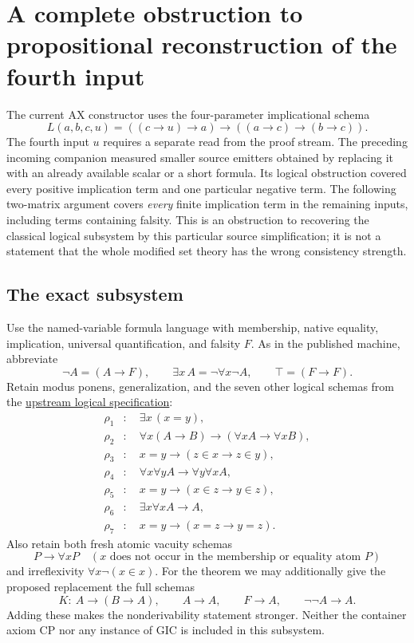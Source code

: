 \section{A complete obstruction to propositional reconstruction of the fourth input}
\label{sec:all-fourth-input-obstruction}

The current AX constructor uses the four-parameter implicational schema
\[
 L(a,b,c,u)=((c\to u)\to a)\to((a\to c)\to(b\to c)).
\]
The fourth input $u$ requires a separate read from the proof stream.
The preceding incoming companion measured smaller source emitters obtained
by replacing it with an already available scalar or a short formula.
Its logical obstruction covered every positive implication term and one
particular negative term.  The following two-matrix argument covers
\emph{every} finite implication term in the remaining inputs, including
terms containing falsity.  This is an obstruction to recovering the
classical logical subsystem by this particular source simplification;
it is not a statement that the whole modified set theory has the wrong
consistency strength.

\subsection{The exact subsystem}

Use the named-variable formula language with membership, native equality,
implication, universal quantification, and falsity $F$.  As in the
published machine, abbreviate
\[
 \neg A=(A\to F),\qquad
 \exists x\,A=\neg\forall x\neg A,
 \qquad\top=(F\to F).
\]
Retain modus ponens, generalization, and the seven other logical schemas
from the
\href{https://github.com/jeff87654/busy-beaver/blob/zf-254/ZF/m254/design/logic.md}
{upstream logical specification}:
\begin{align*}
 \rho_1&:\quad \exists x\,(x=y),\\
 \rho_2&:\quad
  \forall x(A\to B)\to(\forall x A\to\forall x B),\\
 \rho_3&:\quad x=y\to(z\in x\to z\in y),\\
 \rho_4&:\quad \forall x\forall y A\to\forall y\forall x A,\\
 \rho_5&:\quad x=y\to(x\in z\to y\in z),\\
 \rho_6&:\quad \exists x\forall x A\to A,\\
 \rho_7&:\quad x=y\to(x=z\to y=z).
\end{align*}
Also retain both fresh atomic vacuity schemas
\[
 P\to\forall xP\quad(x\text{ does not occur in the membership or equality atom }P)
\]
and irreflexivity $\forall x\neg(x\in x)$.
For the theorem we may additionally give the proposed replacement the
full schemas
\[
 K:\ A\to(B\to A),\qquad A\to A,
 \qquad F\to A,\qquad\neg\neg A\to A.
\]
Adding these makes the nonderivability statement stronger.
Neither the container axiom CP nor any instance of GIC is included in
this subsystem.

